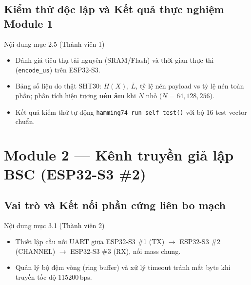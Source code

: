 \documentclass[12pt,a4paper]{report}
\begin{document}
\section{Kiểm thử độc lập và Kết quả thực nghiệm Module 1}
\begin{notebox}{Nội dung mục 2.5 (Thành viên 1)}
\begin{itemize}[leftmargin=*,nosep]
    \item Đánh giá tiêu thụ tài nguyên (SRAM/Flash) và thời gian thực thi (\texttt{encode\_us}) trên ESP32-S3.
    \item Bảng số liệu đo thật SHT30: $H(X)$, $\bar{L}$, tỷ lệ nén payload vs tỷ lệ nén toàn phần; phân tích hiện tượng \textbf{nén âm} khi $N$ nhỏ ($N=64, 128, 256$).
    \item Kết quả kiểm thử tự động \texttt{hamming74\_run\_self\_test()} với bộ 16 test vector chuẩn.
\end{itemize}
\end{notebox}

\chapter{Module 2 --- Kênh truyền giả lập BSC (ESP32-S3 \#2)}

\section{Vai trò và Kết nối phần cứng liên bo mạch}
\begin{notebox}{Nội dung mục 3.1 (Thành viên 2)}
\begin{itemize}[leftmargin=*,nosep]
    \item Thiết lập cầu nối UART giữa ESP32-S3 \#1 (TX) $\rightarrow$ ESP32-S3 \#2 (CHANNEL) $\rightarrow$ ESP32-S3 \#3 (RX), nối mass chung.
    \item Quản lý bộ đệm vòng (ring buffer) và xử lý timeout tránh mất byte khi truyền tốc độ 115200\,bps.
\end{itemize}
\end{notebox}
\end{document}
